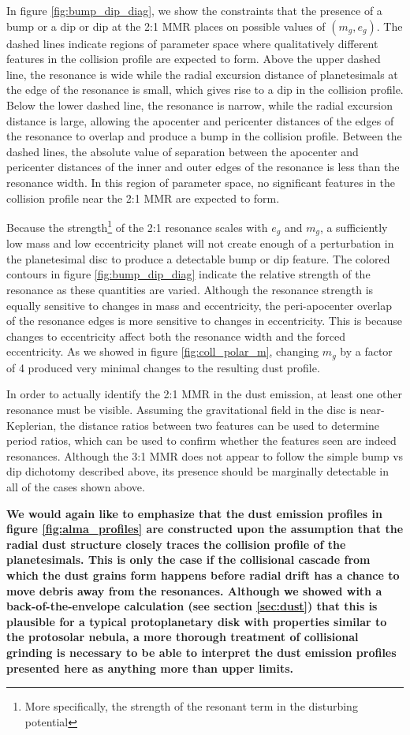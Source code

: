 \documentclass[fleqn,usenatbib]{mnras}
\begin{document}
In figure \ref{fig:bump_dip_diag}, we show the constraints that the presence of a bump or a dip or dip at the 2:1 MMR places on possible values of $(m_{g}, e_{g})$. The dashed
lines indicate regions of parameter space where qualitatively different features in the collision profile are expected to form. Above the upper dashed line, the 
resonance is wide while the radial excursion distance of planetesimals at the edge of the resonance is small, which gives rise to a dip in the collision profile. 
Below the lower dashed line, the resonance is narrow, while the radial excursion distance is large, allowing the apocenter and pericenter distances of the edges 
of the resonance to overlap and produce a bump in the collision profile. Between the dashed lines, the absolute value of separation between the apocenter and 
pericenter distances of the inner and outer edges of the resonance is less than the resonance width. In this region of parameter space, no significant features in 
the collision profile near the 2:1 MMR are expected to form. 

Because the strength\footnote{More specifically, the strength of the resonant term in the disturbing potential} of the 2:1 resonance scales with $e_{g}$ and  $m_{g}$, a sufficiently low mass and low eccentricity planet will not create 
enough of a perturbation in the planetesimal disc to produce a detectable bump or dip feature. The colored contours in figure \ref{fig:bump_dip_diag} 
indicate the relative strength of the resonance as these quantities are varied. Although the resonance strength is equally sensitive to changes in 
mass and eccentricity, the peri-apocenter overlap of the resonance edges is more sensitive to changes in eccentricity. This is because changes to 
eccentricity affect both the resonance width and the forced eccentricity. As we showed in figure \ref{fig:coll_polar_m}, changing $m_{g}$ by a factor 
of 4 produced very minimal changes to the resulting dust profile.

In order to actually identify the 2:1 MMR in the dust emission, at least one other resonance must be visible. Assuming the gravitational field in the 
disc is near-Keplerian, the distance ratios between two features can be used to determine period ratios, which can be used to confirm whether the 
features seen are indeed resonances. Although the 3:1 MMR does not appear to follow the simple bump vs dip dichotomy described above, its 
presence should be marginally detectable in all of the cases shown above.

\textbf{We would again like to emphasize that the dust emission profiles in figure \ref{fig:alma_profiles} are constructed upon the assumption that the radial dust structure closely traces the collision profile of the planetesimals. This is only the case if the collisional cascade from which the dust grains form happens before radial drift has a chance to move debris away from the resonances. Although we showed with a back-of-the-envelope calculation (see section \ref{sec:dust}) that this is plausible for a typical protoplanetary disk with properties similar to the protosolar nebula, a more thorough treatment of collisional grinding is necessary to be able to interpret the dust emission profiles presented here as anything more than upper limits.}
\end{document}
